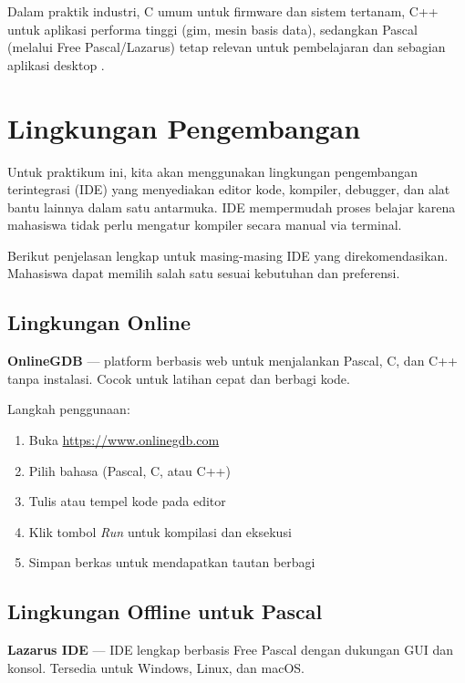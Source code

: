 \documentclass[../main.tex]{subfiles}
\begin{document}
Dalam praktik industri, C umum untuk firmware dan sistem tertanam, C++ untuk aplikasi performa tinggi (gim, mesin basis data), sedangkan Pascal (melalui Free Pascal/Lazarus) tetap relevan untuk pembelajaran dan sebagian aplikasi desktop \parencite{free-pascal-docs}.

\section{Lingkungan Pengembangan}
Untuk praktikum ini, kita akan menggunakan lingkungan pengembangan terintegrasi (IDE) yang menyediakan editor kode, kompiler, debugger, dan alat bantu lainnya dalam satu antarmuka. IDE mempermudah proses belajar karena mahasiswa tidak perlu mengatur kompiler secara manual via terminal.

Berikut penjelasan lengkap untuk masing-masing IDE yang direkomendasikan. Mahasiswa dapat memilih salah satu sesuai kebutuhan dan preferensi.

\subsection{Lingkungan Online}
\textbf{OnlineGDB} \parencite{onlinegdb} — platform berbasis web untuk menjalankan Pascal, C, dan C++ tanpa instalasi. Cocok untuk latihan cepat dan berbagi kode.

Langkah penggunaan:
\begin{enumerate}
  \item Buka \url{https://www.onlinegdb.com}
  \item Pilih bahasa (Pascal, C, atau C++)
  \item Tulis atau tempel kode pada editor
  \item Klik tombol \emph{Run} untuk kompilasi dan eksekusi
  \item Simpan berkas untuk mendapatkan tautan berbagi
\end{enumerate}

\subsection{Lingkungan Offline untuk Pascal}
\textbf{Lazarus IDE} \parencite{lazarus} — IDE lengkap berbasis Free Pascal dengan dukungan GUI dan konsol. Tersedia untuk Windows, Linux, dan macOS.
\end{document}
